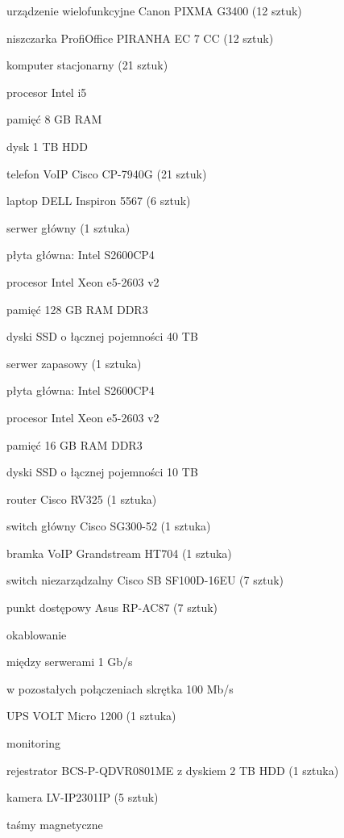 \begin{minipage}[\right]{15cm}
\begin{itemize*}
	\item urządzenie wielofunkcyjne Canon PIXMA G3400 (12 sztuk)
	\item niszczarka ProfiOffice PIRANHA EC 7 CC (12 sztuk)
	\item komputer stacjonarny (21 sztuk)
	\begin{itemize*}
		\item procesor Intel i5
		\item pamięć 8 GB RAM 
		\item dysk 1 TB HDD 
	\end{itemize*}
	\item telefon VoIP Cisco CP-7940G (21 sztuk)
	\item laptop DELL Inspiron 5567 (6 sztuk)
	\item serwer główny (1 sztuka)
	\begin{itemize*}
		\item płyta główna: Intel S2600CP4
		\item procesor Intel Xeon e5-2603 v2
		\item pamięć 128 GB RAM DDR3
		\item dyski SSD o łącznej pojemności 40 TB 
	\end{itemize*}
	\item serwer zapasowy (1 sztuka)
	\begin{itemize*}
		\item płyta główna: Intel S2600CP4
		\item procesor Intel Xeon e5-2603 v2
		\item pamięć 16 GB RAM DDR3
		\item dyski SSD o łącznej pojemności 10 TB 
	\end{itemize*}
	\item router Cisco RV325 (1 sztuka)
	\item switch główny Cisco SG300-52 (1 sztuka)
	\item bramka VoIP Grandstream HT704 (1 sztuka)
	\item switch niezarządzalny Cisco SB SF100D-16EU (7 sztuk)
	\item punkt dostępowy Asus RP-AC87 (7 sztuk)
	\item okablowanie 
	\begin{itemize*}
		\item między serwerami 1 Gb/s
		\item w pozostałych połączeniach skrętka 100 Mb/s
	\end{itemize*}
	\item UPS VOLT Micro 1200 (1 sztuka)
	\item monitoring
	\begin{itemize*}
		\item rejestrator BCS-P-QDVR0801ME z dyskiem 2 TB HDD (1 sztuka)
		\item kamera LV-IP2301IP (5 sztuk)
	\end{itemize*}
	\item taśmy magnetyczne
\end{itemize*}
\end{minipage}

